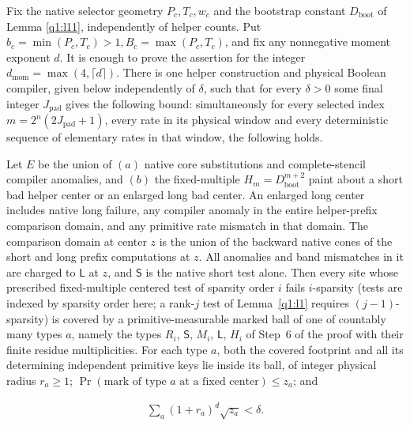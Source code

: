 \begin{lemma}\label{q1:l12}

Fix the native selector geometry \(P_{c},T_{c},w_{c}\) and the bootstrap constant \(D_{\mathrm{boot}}\) of Lemma \ref{q1:l11}, independently of helper counts. Put \(b_{c}=\min (P_{c},T_{c})>1, B_{c}=\max (P_{c},T_{c})\), and fix any nonnegative moment exponent \(d\). It is enough to prove the assertion for the integer \(d_{\mathrm{mom}}=\max (4,\lceil d\rceil)\). There is one helper construction and physical Boolean compiler, given below independently of \(\delta\), such that for every \(\delta>0\) some final integer \(J_{\mathrm{pad}}\) gives the following bound: simultaneously for every selected index \(m=2^{n}(2J_{\mathrm{pad}}+1)\), every rate in its physical window and every deterministic sequence of elementary rates in that window, the following holds.

Let \(E\) be the union of \((a)\) native core substitutions and complete-stencil compiler anomalies, and \((b)\) the fixed-multiple \(H_{m}=D_{\mathrm{boot}}^{m+2}\) paint about a short bad helper center or an enlarged long bad center. An enlarged long center includes native long failure, any compiler anomaly in the entire helper-prefix comparison domain, and any primitive rate mismatch in that domain. The comparison domain at center \(z\) is the union of the backward native cones of the short and long prefix computations at \(z\). All anomalies and band mismatches in it are charged to \(\mathsf L\) at \(z\), and \(\mathsf S\) is the native short test alone. Then every site whose prescribed fixed-multiple centered test of sparsity order \(i\) fails \(i\)-sparsity (tests are indexed by sparsity order here; a rank-\(j\) test of Lemma~\ref{q1:l1} requires \((j-1)\)-sparsity) is covered by a primitive-measurable marked ball of one of countably many types \(a\), namely the types \(R_{i}\), \(\mathsf S\), \(M_{i}\), \(\mathsf L\), \(H_{i}\) of Step~6 of the proof with their finite residue multiplicities. For each type \(a\), both the covered footprint and all its determining independent primitive keys lie inside its ball, of integer physical radius \(r_{a}\ge 1\); \(\Pr(\text{mark of type }a\text{ at a fixed center})\le z_{a}\); and

\begin{equation}\label{q1:e12.1}
\begin{gathered}
\sum _{a} (1+r_{a})^{d} \sqrt{z_{a}} < \delta.
\end{gathered}
\end{equation}


\end{lemma}
